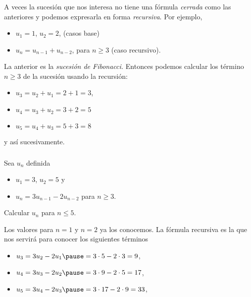 \documentclass{beamer}
\begin{document}
\begin{frame}\frametitle{ }  

A veces la sucesión que nos interesa no tiene una fórmula \textit{cerrada} como las anteriores y podemos expresarla en forma \textit{recursiva}.  \pause Por ejemplo,

\medspace

\begin{itemize}
	\item $u_1=1$, $u_2=2$, (casos base)   \pause
	\item $u_n =u_{n-1} +u_{n-2}$, para $n\ge 3$ (caso recursivo).   \pause
\end{itemize} 

\medspace

La anterior es la \textit{sucesión de Fibonacci.} Entonces podemos calcular los término $n \ge 3$  de la sucesión usando la recursión:

\medspace  \pause

\begin{itemize}
	\item $u_3 =  u_2 + u_1 =  2 +1=3$,  \pause
	\item $u_4 =  u_3 + u_2 = 3 +2 =5$  \pause
	\item $u_5 =  u_4 + u_3 = 5 +3 =8$
\end{itemize} 
y así sucesivamente.
\end{frame}


\begin{frame}\frametitle{} 
	 \begin{ejemplo} Sea $u_n$ definida
	 	\begin{itemize}
	 		\item $ u_1=3$, $u_2=5$ y
	 		\item $u_n=3 u_{n-1} - 2 u_{n-2}$ para $n\geq 3$.
	 	\end{itemize}
 	Calcular $u_n$ para $n \le 5$.\pause 
	 \end{ejemplo}
	\begin{solucion} \pause Los valores para $n=1$ y $n=2$ ya los conocemos. La fórmula recursiva es la que nos servirá para conocer los siguientes términos
	\begin{itemize}
	\pause \item $u_{3} = 3 u_{2} - 2 u_{1}\pause = 3 \cdot 5 - 2 \cdot 3 = 9$,
	\pause \item $u_{4} = 3 u_{3} - 2 u_{2}\pause = 3 \cdot 9 - 2 \cdot 5 = 17$,
	\pause \item $u_{5} = 3 u_{4} - 2 u_{3}\pause = 3 \cdot 17 - 2 \cdot 9  = 33$,

	\end{itemize}
	\end{solucion}
	
	 
	
\end{frame}
\end{document}

